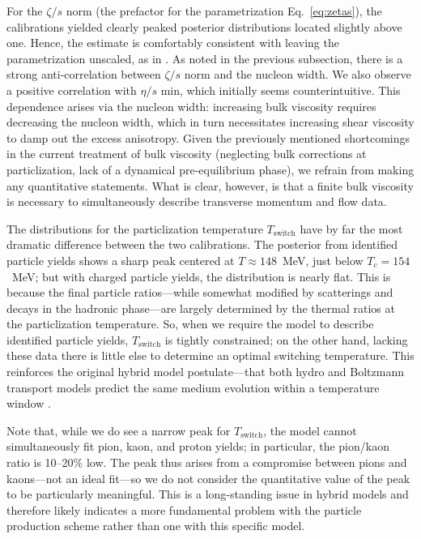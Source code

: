 \documentclass[aps,prc,reprint,amsmath,nofootinbib]{revtex4-1}
\begin{document}
For the $\zeta/s$ norm (the prefactor for the parametrization Eq.~\eqref{eq:zetas}), the calibrations yielded clearly peaked posterior distributions located slightly above one.
Hence, the estimate is comfortably consistent with leaving the parametrization unscaled, as in \cite{Ryu:2015vwa}.
As noted in the previous subsection, there is a strong anti-correlation between $\zeta/s$ norm and the nucleon width.
We also observe a positive correlation with $\eta/s$ min, which initially seems counterintuitive.
This dependence arises via the nucleon width:
increasing bulk viscosity requires decreasing the nucleon width, which in turn necessitates increasing shear viscosity to damp out the excess anisotropy.
Given the previously mentioned shortcomings in the current treatment of bulk viscosity (neglecting bulk corrections at particlization, lack of a dynamical pre-equilibrium phase), we refrain from making any quantitative statements.
What is clear, however, is that a finite bulk viscosity is necessary to simultaneously describe transverse momentum and flow data.

The distributions for the particlization temperature $T_\text{switch}$ have by far the most dramatic difference between the two calibrations.
The posterior from identified particle yields shows a sharp peak centered at $T \approx 148$~MeV, just below $T_c = 154$~MeV;
but with charged particle yields, the distribution is nearly flat.
This is because the final particle ratios---while somewhat modified by scatterings and decays in the hadronic phase---are largely determined by the thermal ratios at the particlization temperature.
So, when we require the model to describe identified particle yields, $T_\text{switch}$ is tightly constrained;
on the other hand, lacking these data there is little else to determine an optimal switching temperature.
This reinforces the original hybrid model postulate---that both hydro and Boltzmann transport models predict the same medium evolution within a temperature window \cite{Bass:2000ib,Nonaka:2006yn,Petersen:2008dd}.

Note that, while we do see a narrow peak for $T_\text{switch}$, the model cannot simultaneously fit pion, kaon, and proton yields;
in particular, the pion/kaon ratio is 10--20\% low.
The peak thus arises from a compromise between pions and kaons---not an ideal fit---so we do not consider the quantitative value of the peak to be particularly meaningful.
This is a long-standing issue in hybrid models \cite{Song:2013qma} and therefore likely indicates a more fundamental problem with the particle production scheme rather than one with this specific model.
\end{document}

